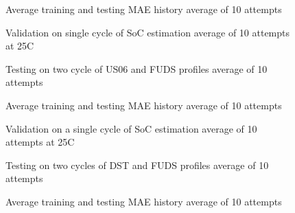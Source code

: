 \begin{figure*}[htbp]
    \centering
    \begin{subfigure}[b]{0.325\textwidth}
        \centering
        
        \caption{Average training and testing MAE history average of 10 attempts}
    \end{subfigure}
    \hfill
    \begin{subfigure}[b]{0.325\textwidth}
        \centering
        
        \caption{Validation on single cycle of SoC estimation average of 10 attempts at 25\textdegree{}C}
    \end{subfigure}
    \hfill
    \begin{subfigure}[b]{0.325\textwidth}
        \centering
        
        \caption{Testing on two cycle of US06 and FUDS profiles average of 10 attempts}
        \label{subfig:Model-4res-DSTvsFUDS}
    \end{subfigure}
    \begin{subfigure}[b]{0.325\textwidth}
        \centering
        
        \caption{Average training and testing MAE history average of 10 attempts}
    \end{subfigure}
    \hfill
    \begin{subfigure}[b]{0.325\textwidth}
        \centering
        
        \caption{Validation on a single cycle of SoC estimation average of 10 attempts at 25\textdegree{}C}
    \end{subfigure}
    \hfill
    \begin{subfigure}[b]{0.325\textwidth}
        \centering
        
        \caption{Testing on two cycles of DST and FUDS profiles average of 10 attempts}
    \end{subfigure}
    \begin{subfigure}[b]{0.325\textwidth}
        \centering
        
        \caption{Average training and testing MAE history average of 10 attempts}

\end{subfigure}
\end{figure*}
